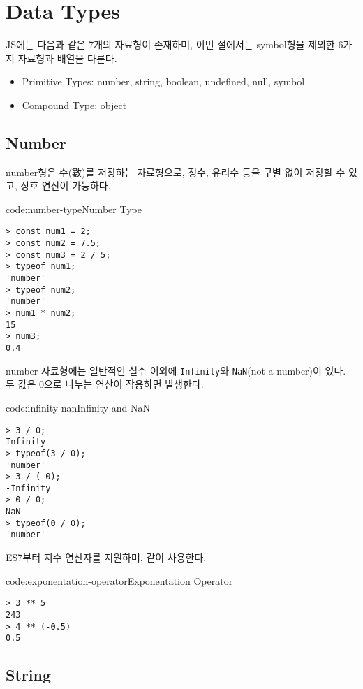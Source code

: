 \section{Data Types} \label{sect:data-types}

JS에는 다음과 같은 7개의 자료형이 존재하며, 이번 절에서는 symbol형을 제외한 6가지 자료형과 배열을 다룬다.

\begin{itemize}
    \item Primitive Types: number, string, boolean, undefined, null, symbol
    \item Compound Type: object
\end{itemize}

\subsection*{Number}

number형은 수(數)를 저장하는 자료형으로, 정수, 유리수 등을 구별 없이 저장할 수 있고, 상호 연산이 가능하다.

\begin{codeenv}{code:number-type}{Number Type}\begin{verbatim}
> const num1 = 2;
> const num2 = 7.5;
> const num3 = 2 / 5;
> typeof num1;
'number'
> typeof num2;
'number'
> num1 * num2;
15
> num3;
0.4
\end{verbatim}
\end{codeenv}

number 자료형에는 일반적인 실수 이외에 \texttt{Infinity}와 \texttt{NaN}(not a number)이 있다. 두 값은 0으로 나누는 연산이 작용하면 발생한다.

\begin{codeenv}{code:infinity-nan}{Infinity and NaN}\begin{verbatim}
> 3 / 0;
Infinity
> typeof(3 / 0);
'number'
> 3 / (-0);
-Infinity
> 0 / 0;
NaN
> typeof(0 / 0);
'number'
\end{verbatim}
\end{codeenv}

ES7부터 지수 연산자를 지원하며, \와 같이 사용한다.

\begin{codeenv}{code:exponentation-operator}{Exponentation Operator}\begin{verbatim}
> 3 ** 5
243
> 4 ** (-0.5)
0.5
\end{verbatim}
\end{codeenv}

\subsection*{String}

